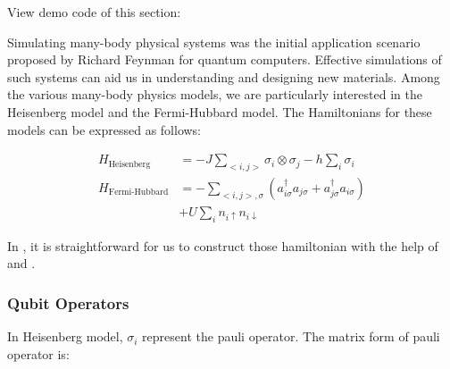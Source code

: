 
View demo code of this section: 

Simulating many-body physical systems was the initial application scenario proposed by Richard Feynman for quantum computers. Effective simulations of such systems can aid us in understanding and designing new materials. Among the various many-body physics models, we are particularly interested in the Heisenberg model and the Fermi-Hubbard model. The Hamiltonians for these models can be expressed as follows:

\begin{align*}
    H_\text{Heisenberg}    & = -J\sum_{<i,j>}\sigma_i\otimes \sigma_j-h\sum_i\sigma_i                                             \\
    H_\text{Fermi-Hubbard} & = -\sum_{<i,j>,\sigma}\left(a_{i\sigma}^\dagger a_{j\sigma} + a_{j\sigma}^\dagger a_{i\sigma}\right) \\
                           & + U\sum_i n_{i\uparrow}n_{i\downarrow}
\end{align*}

In \MindQuantum, it is straightforward for us to construct those hamiltonian with the help of \QubitOperator and \FermionOperator.

\subsubsection{Qubit Operators}

In Heisenberg model, $\sigma_i$ represent the pauli operator. The matrix form of pauli operator is:

